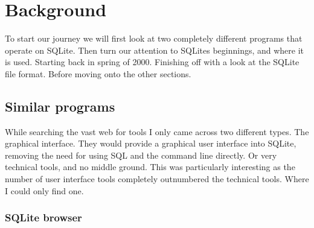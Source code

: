 %
%
%
%
%
%

\section{Background}
\label{sec:sqlite_intro}

To start our journey we will first look at two completely different programs that operate on SQLite. Then turn our attention to SQLites beginnings, and where it is used. Starting back in spring of 2000. Finishing off with a look at the SQLite file format. Before moving onto the other sections.

\subsection{Similar programs}
\label{subsec:similar_programs}

While searching the vast web for tools I only came across two different types. The graphical interface. They would provide a graphical user interface into SQLite, removing the need for using SQL and the command line directly. Or very technical tools, and no middle ground. This was particularly interesting as the number of user interface tools completely outnumbered the technical tools. Where I could only find one.

\subsubsection{SQLite browser}
\label{subsubsec:sqlite_browser}

